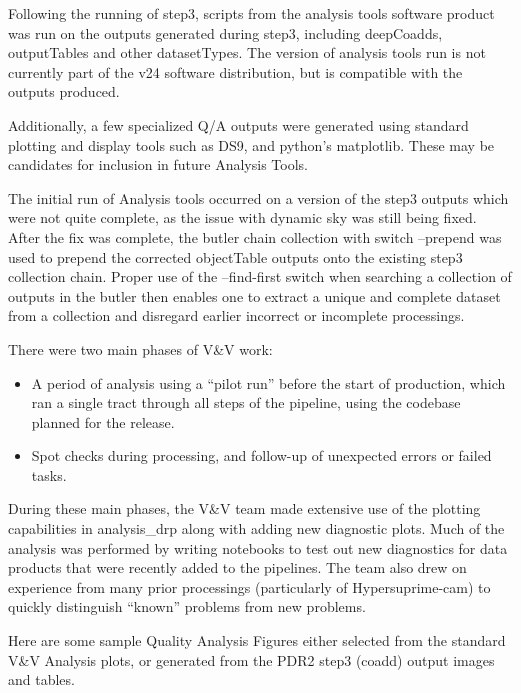 Following the running of step3, scripts from the analysis tools software product
was run on the outputs generated during step3, including deepCoadds, outputTables and other
datasetTypes. The version of analysis tools run is not currently part of the v24 software distribution,
but is compatible with the outputs produced.

Additionally, a few specialized Q/A outputs were generated using standard plotting and display
tools such as DS9, and python's matplotlib.  These may be candidates for inclusion in future 
Analysis Tools.

The initial run of Analysis tools occurred on a version of the step3 outputs which were not
quite complete, as the issue with dynamic sky was still being fixed.  
After the fix was complete,  the butler chain collection with switch --prepend was used to
prepend the corrected objectTable outputs onto the existing step3 collection chain.
Proper use of the --find-first switch when searching a collection of outputs in the butler then
enables one to extract a unique and complete dataset from a collection and disregard earlier incorrect or 
incomplete processings.

There were two main phases of V\&V work:

\begin{itemize}
\item A period of analysis using a “pilot run” before the start of production, which ran a single
tract through all steps of the pipeline, using the codebase planned for the release.
\item Spot checks during processing, and follow-up of unexpected errors or failed tasks.
\end{itemize}

During these main phases, the V\&V team made extensive use of the plotting capabilities in
analysis\_drp along with adding new diagnostic plots. Much of the analysis was performed by writing
notebooks to test out new diagnostics for data products that were recently added to the pipelines.
The team also drew on experience from many prior processings (particularly of Hypersuprime-cam) to
quickly distinguish ``known'' problems from new problems.

Here are some sample Quality Analysis Figures either selected from the 
standard V\&V Analysis plots, or generated from the PDR2 step3 (coadd) 
output images and tables.

